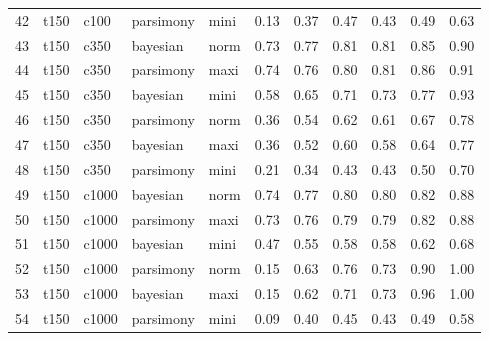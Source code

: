 \documentclass[12pt,letterpaper]{article}
\begin{document}
\begin{longtable}{rllllrrrrrr}
  42 & t150 & c100 & parsimony & mini & 0.13 & 0.37 & 0.47 & 0.43 & 0.49 & 0.63 \\ 
  43 & t150 & c350 & bayesian & norm & 0.73 & 0.77 & 0.81 & 0.81 & 0.85 & 0.90 \\ 
  44 & t150 & c350 & parsimony & maxi & 0.74 & 0.76 & 0.80 & 0.81 & 0.86 & 0.91 \\ 
  45 & t150 & c350 & bayesian & mini & 0.58 & 0.65 & 0.71 & 0.73 & 0.77 & 0.93 \\ 
  46 & t150 & c350 & parsimony & norm & 0.36 & 0.54 & 0.62 & 0.61 & 0.67 & 0.78 \\ 
  47 & t150 & c350 & bayesian & maxi & 0.36 & 0.52 & 0.60 & 0.58 & 0.64 & 0.77 \\ 
  48 & t150 & c350 & parsimony & mini & 0.21 & 0.34 & 0.43 & 0.43 & 0.50 & 0.70 \\ 
  49 & t150 & c1000 & bayesian & norm & 0.74 & 0.77 & 0.80 & 0.80 & 0.82 & 0.88 \\ 
  50 & t150 & c1000 & parsimony & maxi & 0.73 & 0.76 & 0.79 & 0.79 & 0.82 & 0.88 \\ 
  51 & t150 & c1000 & bayesian & mini & 0.47 & 0.55 & 0.58 & 0.58 & 0.62 & 0.68 \\ 
  52 & t150 & c1000 & parsimony & norm & 0.15 & 0.63 & 0.76 & 0.73 & 0.90 & 1.00 \\ 
  53 & t150 & c1000 & bayesian & maxi & 0.15 & 0.62 & 0.71 & 0.73 & 0.96 & 1.00 \\ 
  54 & t150 & c1000 & parsimony & mini & 0.09 & 0.40 & 0.45 & 0.43 & 0.49 & 0.58 \\ 
   \hline
\end{longtable}
\end{document}
